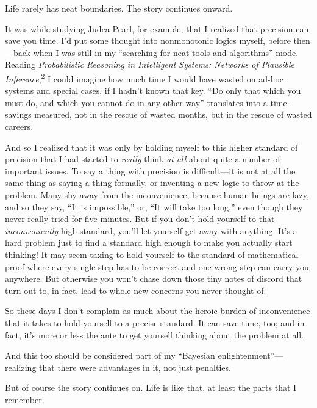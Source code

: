 {
 Life rarely has neat boundaries. The story continues onward.}

{
 It was while studying Judea Pearl, for example, that I realized
that precision can save you time. I'd put some thought
into nonmonotonic logics myself, before then---back when I was still in
my ``searching for neat tools and
algorithms'' mode. Reading \textit{Probabilistic
Reasoning in Intelligent Systems: Networks of Plausible
Inference},\textsuperscript{2} I could imagine how much time I would
have wasted on ad-hoc systems and special cases, if I
hadn't known that key. ``Do only that
which you must do, and which you cannot do in any other
way'' translates into a time-savings measured, not in
the rescue of wasted months, but in the rescue of wasted careers.}

{
 And so I realized that it was only by holding myself to this
higher standard of precision that I had started to \textit{really}
think \textit{at all} about quite a number of important issues. To say
a thing with precision is difficult---it is not at all the same thing
as saying a thing formally, or inventing a new logic to throw at the
problem. Many shy away from the inconvenience, because human beings are
lazy, and so they say, ``It is
impossible,'' or, ``It will take too
long,'' even though they never really tried for five
minutes. But if you don't hold yourself to that
\textit{inconveniently} high standard, you'll let
yourself get away with anything. It's a hard problem
just to find a standard high enough to make you actually start
thinking! It may seem taxing to hold yourself to the standard of
mathematical proof where every single step has to be correct and one
wrong step can carry you anywhere. But otherwise you
won't chase down those tiny notes of discord that turn
out to, in fact, lead to whole new concerns you never thought of.}

{
 So these days I don't complain as much about the
heroic burden of inconvenience that it takes to hold yourself to a
precise standard. It can save time, too; and in fact,
it's more or less the ante to get yourself thinking
about the problem at all.}

{
 And this too should be considered part of my
``Bayesian
enlightenment''---realizing that there were
advantages in it, not just penalties.}

{
 But of course the story continues on. Life is like that, at least
the parts that I remember.}

